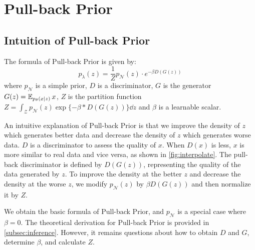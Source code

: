 
\section{Pull-back Prior}\label{sec:pull_back_prior}

\subsection{Intuition of Pull-back Prior}\label{subsec:intuition}

The formula of Pull-back Prior is given by:
\begin{equation}\label{eq:pull_back_prior}
	p_\lambda(z) = \frac{1}{Z} p_\mathcal{N}(z) \cdot e^{- \beta D(G(z))} \tag{4}
\end{equation}
where $p_\mathcal{N}$ is a simple prior, $D$ is a discriminator, $G$ is the generator $G(z) = \operatorname{\mathbb{E}}_{p_\theta(x|z)} x$, $Z$ is the partition function $Z = \int_{\mathcal{Z}} p_\mathcal{N}(z) \exp\{- \beta * D(G(z))\} \dd z$ and $\beta$ is a learnable scalar.

An intuitive explanation of Pull-back Prior is that we improve the density of $z$ which generates better data and decrease the density of $z$ which generates worse data. 
$D$ is a discriminator to assess the quality of $x$. When $D(x)$ is less, $x$ is more similar to real data and vice versa, as shown in \cref{fig:interpolate}. The pull-back discriminator is defined by $D(G(z))$, representing the quality of the data generated by $z$. To improve the density at the better $z$ and decrease the density at the worse $z$, we modify $p_\mathcal{N}(z)$ by $\beta D(G(z))$ and then normalize it by $Z$. 

We obtain the basic formula of Pull-back Prior, and $p_\mathcal{N}$ is a special case where $\beta = 0$. The theoretical derivation for Pull-back Prior is provided in \cref{subsec:inference}. However, it remains questions about how to obtain $D$ and $G$, determine $\beta$, and calculate $Z$. 

